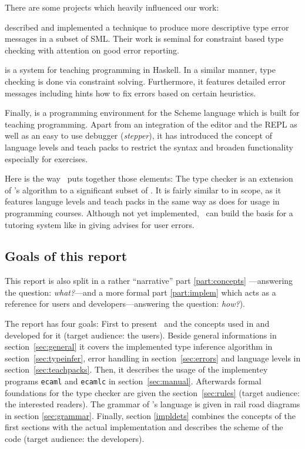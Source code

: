 There are some projects which heavily influenced our work:

\citet{haackwells04} described and implemented a technique to produce more
descriptive type error messages in a subset of SML.  
Their work is seminal for constraint based type checking with attention 
on good error reporting.

 \citep{helium-hw03} is a system for teaching programming 
in Haskell. In a similar manner, type checking is done via constraint 
solving. Furthermore, it features detailed error messages including 
hints how to fix errors based on certain heuristics.

Finally,  \citep{Felleisen98thedrscheme} is a programming 
environment for the Scheme language which is built for teaching
programming.  Apart from an integration of the editor and the REPL as well as an
easy to use debugger (\emph{stepper}), it has introduced the concept of language
levels and teach packs to restrict the syntax and broaden functionality
especially for exercises.

Here is the way \easyocaml\ puts together those elements: The type checker is an
extension of \citet{haackwells04}'s  algorithm to a significant subset of
\ocaml. It is fairly similar to  in scope, as it features languge levels
and teach packs in the same way as  does for usage in programming
courses. Although not yet implemented, \easyocaml\ can build the basis for a
tutoring system like  in giving advises for user errors.


\subsection*{Goals of this report}

This report is also split in a rather ``narrative'' part \ref{part:concepts}%
---answering the question: \emph{what?}---and a more formal part \ref{part:implem}
which acts as a reference for users and developers---answering the question:
\emph{how?}).

The report has four goals:
First to present \easyocaml\ and the concepts used in and developed for it
(target audience: the users). Beside general informations in
section~\ref{sec:general} it covers the implemented type inference algorithm in
section~\ref{sec:typeinfer}, error handling in section~\ref{sec:errors} and
language levels in section~\ref{sec:teachpacks}.
Then, it describes the usage of the implementey programs \texttt{ecaml} and
\texttt{ecamlc} in section~\ref{sec:manual}.
Afterwards formal foundations for the type checker are given the
section~\ref{sec:rules} (target audience: the interested readers).
The grammar of \easyocaml's language is given in rail road diagrams in section
\ref{sec:grammar}.
Finally, section \ref{impldets} combines the concepts of the first sections with
the actual implementation and describes the scheme of the code (target audience:
the developers).

